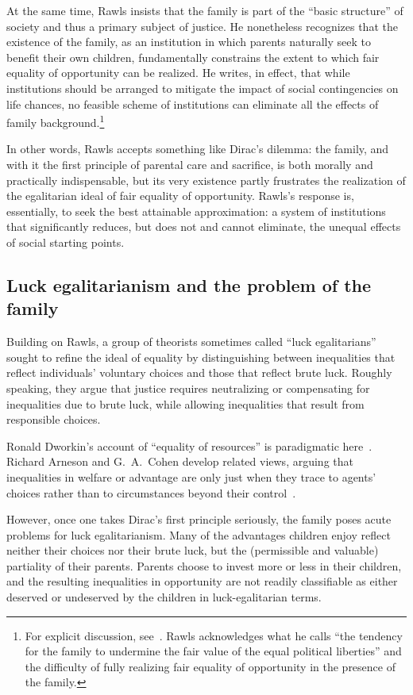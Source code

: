 \documentclass[%
  reprint,
  superscriptaddress,
  amsmath,amssymb,
  pra,
  floatfix,
  longbibliography
]{revtex4-2}
\begin{document}
At the same time, Rawls insists that the family is part of the
``basic structure'' of society and thus a primary subject of justice.
He nonetheless recognizes that the existence of the family, as an
institution in which parents naturally seek to benefit their own
children, fundamentally constrains the extent to which fair equality of
opportunity can be realized.  He writes, in effect, that while
institutions should be arranged to mitigate the impact of social
contingencies on life chances, no feasible scheme of institutions can
eliminate all the effects of family background.\footnote{For explicit
discussion, see~\cite[sect.~17, 46]{Rawls1999}.  Rawls acknowledges
what he calls ``the tendency for the family to undermine the fair value
of the equal political liberties'' and the difficulty of fully
realizing fair equality of opportunity in the presence of the family.}

In other words, Rawls accepts something like Dirac's dilemma:
the family, and with it the first principle of parental care and
sacrifice, is both morally and practically indispensable, but its very
existence partly frustrates the realization of the egalitarian ideal of
fair equality of opportunity.  Rawls's response is, essentially, to
seek the best attainable approximation: a system of institutions that
significantly reduces, but does not and cannot eliminate, the unequal
effects of social starting points.

\subsection{Luck egalitarianism and the problem of the family}

Building on Rawls, a group of theorists sometimes called
``luck egalitarians'' sought to refine the ideal of equality by
distinguishing between inequalities that reflect individuals' voluntary
choices and those that reflect brute luck.  Roughly speaking, they
argue that justice requires neutralizing or compensating for
inequalities due to brute luck, while allowing inequalities that
result from responsible choices.

Ronald Dworkin's account of ``equality of resources'' is paradigmatic
here~\cite{Dworkin2000}.  Richard Arneson and G.~A.~Cohen develop
related views, arguing that inequalities in welfare or advantage are
only just when they trace to agents' choices rather than to
circumstances beyond their control~\cite{Arneson1989,Cohen2008}.

However, once one takes Dirac's first principle seriously, the family
poses acute problems for luck egalitarianism.  Many of the advantages
children enjoy reflect neither their choices nor their brute
luck, but the (permissible and valuable) partiality of their parents.
Parents choose to invest more or less in their children, and the
resulting inequalities in opportunity are not readily classifiable as
either deserved or undeserved by the children in luck-egalitarian
terms.
\end{document}
